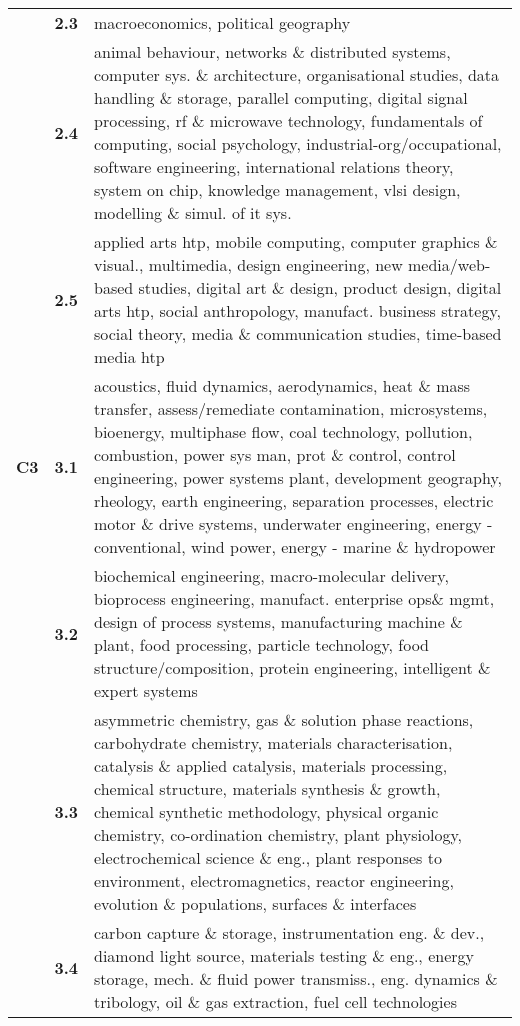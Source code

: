 \begin{spacing}{0.9}
\begin{longtable}[r]{r|r|p{11.5cm}}
& \textbf{2.3} & {macroeconomics, political geography}\\
& \textbf{2.4} & {animal behaviour, networks \& distributed systems, computer sys. \& architecture, organisational studies, data handling \& storage, parallel computing, digital signal processing, rf \& microwave technology, fundamentals of computing, social psychology, industrial-org/occupational, software engineering, international relations theory, system on chip, knowledge management, vlsi design, modelling \& simul. of it sys.}\\
& \textbf{2.5} & {applied arts htp, mobile computing, computer graphics \& visual., multimedia, design engineering, new media/web-based studies, digital art \& design, product design, digital arts htp, social anthropology, manufact. business strategy, social theory, media \& communication studies, time-based media htp}\\
\hline
\textbf{C3}
& \textbf{3.1} & {acoustics, fluid dynamics, aerodynamics, heat \& mass transfer, assess/remediate contamination, microsystems, bioenergy, multiphase flow, coal technology, pollution, combustion, power sys man, prot \& control, control engineering, power systems plant, development geography, rheology, earth engineering, separation processes, electric motor \& drive systems, underwater engineering, energy - conventional, wind power, energy - marine \& hydropower}\\
& \textbf{3.2} & {biochemical engineering, macro-molecular delivery, bioprocess engineering, manufact. enterprise ops\& mgmt, design of process systems, manufacturing machine \& plant, food processing, particle technology, food structure/composition, protein engineering, intelligent \& expert systems}\\
& \textbf{3.3} & {asymmetric chemistry, gas \& solution phase reactions, carbohydrate chemistry, materials characterisation, catalysis \& applied catalysis, materials processing, chemical structure, materials synthesis \& growth, chemical synthetic methodology, physical organic chemistry, co-ordination chemistry, plant physiology, electrochemical science \& eng., plant responses to environment, electromagnetics, reactor engineering, evolution \& populations, surfaces \& interfaces}\\
& \textbf{3.4} & {carbon capture \& storage, instrumentation eng. \& dev., diamond light source, materials testing \& eng., energy storage, mech. \& fluid power transmiss., eng. dynamics \& tribology, oil \& gas extraction, fuel cell technologies}\\

\end{longtable}
\end{spacing}
